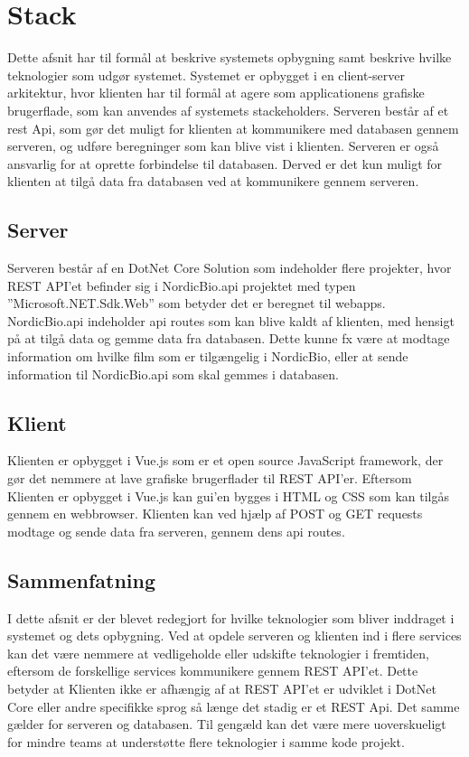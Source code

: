 \section{Stack}
Dette afsnit har til formål at beskrive systemets opbygning samt beskrive hvilke teknologier som udgør systemet. 
Systemet er opbygget i en client-server arkitektur, hvor klienten har til formål at agere som applicationens grafiske 
brugerflade, som kan anvendes af systemets stackeholders. Serveren består af et rest Api, som gør det muligt for klienten 
at kommunikere med databasen gennem serveren, og udføre beregninger som kan blive vist i klienten. Serveren er også 
ansvarlig for at oprette forbindelse til databasen. Derved er det kun muligt for klienten at tilgå data fra databasen 
ved at kommunikere gennem serveren.\\

\subsection{Server}
Serveren består af en DotNet Core Solution som indeholder flere projekter, hvor REST API’et befinder sig i NordicBio.api 
projektet med typen ”Microsoft.NET.Sdk.Web” som betyder det er beregnet til webapps. 
NordicBio.api indeholder api routes som kan blive kaldt af klienten, med hensigt på at tilgå data og gemme data fra databasen. 
Dette kunne fx være at modtage information om hvilke film som er tilgængelig i NordicBio, eller at sende information til 
NordicBio.api som skal gemmes i databasen.\\

\subsection{Klient}
Klienten er opbygget i Vue.js som er et open source JavaScript framework, der gør det nemmere at lave grafiske 
brugerflader til REST API’er. Eftersom Klienten er opbygget i Vue.js kan gui’en bygges i HTML og CSS som kan tilgås 
gennem en webbrowser. Klienten kan ved hjælp af POST og GET requests modtage og sende data fra serveren, 
gennem dens api routes.\\

\subsection{Sammenfatning}
I dette afsnit er der blevet redegjort for hvilke teknologier som bliver inddraget i systemet og dets opbygning. 
Ved at opdele serveren og klienten ind i flere services kan det være nemmere at vedligeholde eller udskifte teknologier 
i fremtiden, eftersom de forskellige services kommunikere gennem REST API’et. 
Dette betyder at Klienten ikke er afhængig af at REST API’et er udviklet i DotNet Core eller andre specifikke sprog så 
længe det stadig er et REST Api. Det samme gælder for serveren og databasen. Til gengæld kan det være mere uoverskueligt 
for mindre teams at understøtte flere teknologier i samme kode projekt. 


